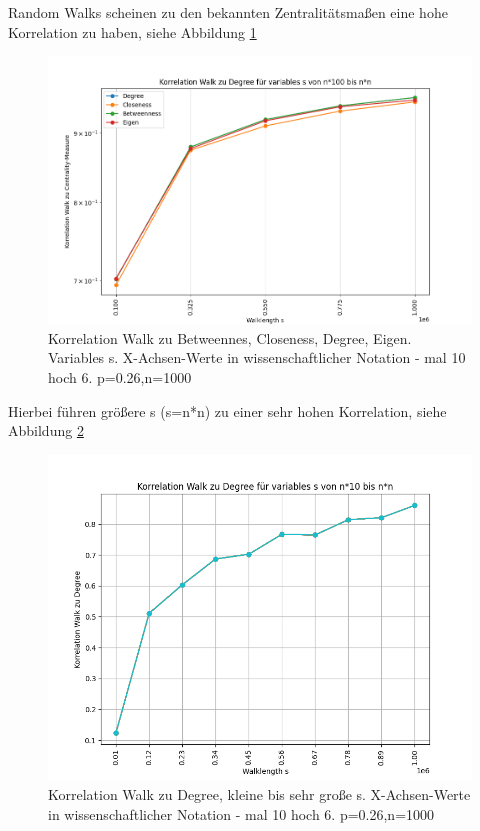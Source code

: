 Random Walks scheinen zu den bekannten Zentralitätsmaßen eine hohe Korrelation zu haben, siehe Abbildung \ref{fig:}
\begin{figure}
    \centering
    \includegraphics[width=\textwidth]{template/chapters/KorrelationWalkZuAllenAnderen_und_Eigen.png}
    \caption{Korrelation Walk zu Betweennes, Closeness, Degree, Eigen. Variables s. X-Achsen-Werte in wissenschaftlicher Notation - mal 10 hoch 6. p=0.26,n=1000}
    \label{fig:}
\end{figure} 


Hierbei führen größere s (s=n*n) zu einer sehr hohen Korrelation, siehe Abbildung \ref{fig:corr_deg_var_s}
\begin{figure}
    \centering
    \includegraphics[width=\textwidth]{template/chapters/KorrelationWalkDegree_variables_sn10-sNtimesN.png}
    \caption{Korrelation Walk zu Degree, kleine bis sehr große s. X-Achsen-Werte in wissenschaftlicher Notation - mal 10 hoch 6. p=0.26,n=1000}
    \label{fig:corr_deg_var_s}
\end{figure}

